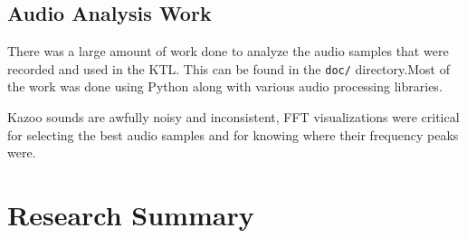 \documentclass[]{article}
\begin{document}
\subsection{Audio Analysis Work}

There was a large amount of work done to analyze the audio samples that were recorded and used in the KTL. This can be found in the \texttt{doc/} directory.Most of the work was done using Python along with various audio processing libraries.

Kazoo sounds are awfully noisy and inconsistent, FFT visualizations were critical for selecting the best audio samples and for knowing where their frequency peaks were.


\section{Research Summary}
\end{document}
